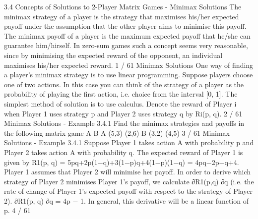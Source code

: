\documentclass[]{report}
\begin{document}
3.4 Concepts of Solutions to 2-Player Matrix Games -
Minimax Solutions
The minimax strategy of a player is the strategy that maximises
his/her expected payoff under the assumption that the other player
aims to minimise this payoff.
The minimax payoff of a player is the maximum expected payoff
that he/she can guarantee him/hirself.
In zero-sum games such a concept seems very reasonable, since by
minimising the expected reward of the opponent, an individual
maximises his/her expected reward.
1 / 61
Minimax Solutions
One way of finding a player’s minimax strategy is to use linear
programming.
Suppose players choose one of two actions. In this case you can
think of the strategy of a player as the probability of playing the
first action, i.e. choice from the interval [0, 1]. The simplest
method of solution is to use calculus.
Denote the reward of Player i when Player 1 uses strategy p and
Player 2 uses strategy q by Ri(p, q).
2 / 61
Minimax Solutions - Example 3.4.1
Find the minimax strategies and payoffs in the following matrix
game
A B
A (5,3) (2,6)
B (3,2) (4,5)
3 / 61
Minimax Solutions - Example 3.4.1
Suppose Player 1 takes action A with probability p and Player 2
takes action A with probability q. The expected reward of Player 1
is given by
R1(p, q) = 5pq+2p(1−q)+3(1−p)q+4(1−p)(1−q) = 4pq−2p−q+4.
Player 1 assumes that Player 2 will minimise her payoff. In order to
derive which strategy of Player 2 minimises Player 1’s payoff, we
calculate ∂R1(p,q)
∂q
(i.e. the rate of change of Player 1’s expected
payoff with respect to the strategy of Player 2).
∂R1(p, q)
∂q
= 4p − 1.
In general, this derivative will be a linear function of p.
4 / 61
\end{document}
